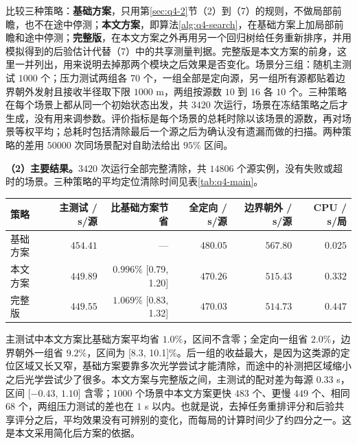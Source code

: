 比较三种策略：\textbf{基础方案}，只用第\ref{sec:q4-2}节（2）到（7）的规则，不做局部前瞻，也不在途中停测；\textbf{本文方案}，即算法\ref{alg:q4-search}，在基础方案上加局部前瞻和途中停测；\textbf{完整版}，在本文方案之外再用另一个回归树给任务重新排序，并用模拟得到的后验估计代替（7）中的共享测量判据。完整版是本文方案的前身，这里一并列出，用来说明去掉那两个模块之后效果是否变化。场景分三组：随机主测试 $1000$ 个；压力测试两组各 $70$ 个，一组全部是定向源，另一组所有源都贴着边界朝外发射且接收半径取下限 $1000$ m，两组按源数 $10$ 到 $16$ 各 $10$ 个。三种策略在每个场景上都从同一个初始状态出发，共 $3420$ 次运行，场景在冻结策略之后才生成，没有用来调参数。评价指标是每个场景的总耗时除以该场景的源数，再对场景等权平均；总耗时包括清除最后一个源之后为确认没有遗漏而做的扫描。两种策略的差用 $50000$ 次同场景配对自助法给出 $95\%$ 区间。

\textbf{（2）主要结果。}$3420$ 次运行全部完整清除，共 $14806$ 个源实例，没有失败或超时的场景。三种策略的平均定位清除时间见表\ref{tab:q4-main}。

\Needspace{40mm}
\begin{center}
\begin{minipage}{\linewidth}
\centering\small
{}
\label{tab:q4-main}
\vspace{4pt}
\begin{tabular}{@{}lrrrrr@{}}
\toprule
策略 & 主测试 / s/源 & 比基础方案节省 & 全定向 / s/源 & 边界朝外 / s/源 & CPU / s/局 \\
\midrule
基础方案 & $454.41$ & --- & $480.05$ & $567.80$ & $0.025$ \\
本文方案 & $449.89$ & $0.996\%$ {[}0.79, 1.20{]} & $470.26$ & $515.43$ & $0.332$ \\
完整版 & $449.55$ & $1.069\%$ {[}0.83, 1.32{]} & $470.03$ & $514.73$ & $0.447$ \\
\bottomrule
\end{tabular}
\end{minipage}
\end{center}

主测试中本文方案比基础方案平均省 $1.0\%$，区间不含零；全定向一组省 $2.0\%$，边界朝外一组省 $9.2\%$，区间为 {[}8.3, 10.1{]}\%。后一组的收益最大，是因为这类源的定位区域又长又窄，基础方案要靠多次光学尝试才能清除，而途中的补测把区域缩小之后光学尝试少了很多。本文方案与完整版之间，主测试的配对差为每源 $0.33$ s，区间 {[}$-0.43$, $1.10${]} 含零；$1000$ 个场景中本文方案更快 $483$ 个、更慢 $449$ 个、相同 $68$ 个，两组压力测试的差也在 $1$ s 以内。也就是说，去掉任务重排评分和后验共享评分之后，平均效果没有可辨别的变化，而每局的计算时间少了约四分之一。这是本文采用简化后方案的依据。

